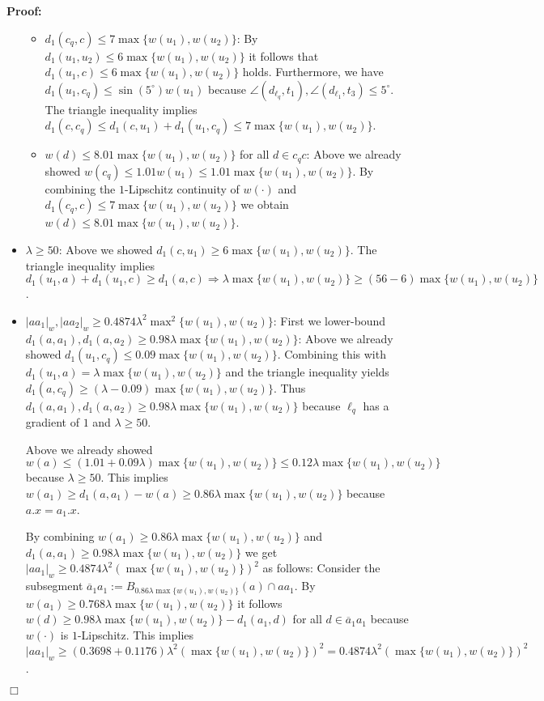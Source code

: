 \documentclass[a4paper,11pt]{article}
\newenvironment{proof}{\textbf{Proof:}}{\hspace*{0mm}\hfill\ensuremath{\Box}}
\begin{document}
\begin{proof}
\begin{itemize}
\begin{itemize}
				\item $d_1(c_q,c) \leq 7 \max \{ w(u_1), w(u_2) \}$: By $d_1(u_1,u_2) \leq 6 \max \{ w(u_1), w(u_2) \}$ it follows that $d_1(u_1,c) \leq 6 \max \{ w(u_1), w(u_2) \}$ holds. Furthermore, we have $d_1(u_1,c_q) \leq \sin (5^{\circ}) w(u_1)$ because $\angle (d_{\ell_q},t_1),\angle (d_{\ell_1}, t_3) \leq 5^{\circ}$. The triangle inequality implies $d_1(c,c_q) \leq d_1(c,u_1) + d_1(u_1,c_q) \leq 7 \max \{ w(u_1), w(u_2) \}$.
				\item $w(d) \leq 8.01 \max \{ w(u_1), w(u_2) \}$ for all $d \in c_qc$: Above we already showed $w(c_q) \leq 1.01 w(u_1) \leq 1.01 \max \{ w(u_1),w(u_2) \}$. By combining the $1$-Lipschitz continuity of $w(\cdot)$ and $d_1(c_q,c) \leq 7 \max \{ w(u_1), w(u_2) \}$ we obtain $w(d) \leq 8.01 \max \{ w(u_1), w(u_2) \}$.
			\end{itemize}
		\item $\lambda \geq 50$: Above we showed $d_1(c,u_1) \geq 6 \max \{ w(u_1), w(u_2) \}$. The triangle inequality implies $d_1(u_1,a) + d_1(u_1,c) \geq d_1(a,c) \Rightarrow \lambda \max \{ w(u_1), w(u_2) \} \geq (56 - 6) \max \{ w(u_1),w(u_2) \}$.
		\item $|aa_1|_w, |aa_2|_w \geq 0.4874 \lambda^2 \max^2 \{ w(u_1),w(u_2) \}$: First we lower-bound $d_1(a,a_1), d_1(a,a_2) \geq 0.98 \lambda \max \{ w(u_1),w(u_2) \}$: Above we already showed $d_1(u_1,c_q) \leq 0.09 \max \{ w(u_1),w(u_2) \}$. Combining this with $d_1(u_1,a) = \lambda \max \{ w(u_1),w(u_2) \}$ and the triangle inequality yields $d_1(a,c_q) \geq (\lambda-0.09) \max \{ w(u_1), w(u_2) \}$. Thus $d_1(a,a_1), d_1(a,a_2) \geq 0.98 \lambda \max \{ w(u_1),w(u_2) \}$ because $\ell_q$ has a gradient of $1$ and $\lambda \geq 50$. 
		
	Above we already showed $w(a) \leq (1.01 + 0.09 \lambda) \max \{ w(u_1), w(u_2) \} \leq 0.12 \lambda \max \{ w(u_1),w(u_2) \}$ because $\lambda \geq 50$. This implies $w(a_1) \geq d_1(a,a_1) - w(a) \geq 0.86 \lambda \max \{ w(u_1),w(u_2) \}$ because $a.x = a_1.x$.
		
	By combining $w(a_1) \geq 0.86 \lambda \max \{ w(u_1),w(u_2) \}$ and $d_1(a,a_1) \geq 0.98 \lambda \max \{ w(u_1),w(u_2) \}$ we get $|aa_1|_w \geq 0.4874 \lambda^2 (\max \{ w(u_1),w(u_2)\})^2$ as follows: Consider the subsegment $\overline{a}_1a_1 := B_{0.86 \lambda \max \{ w(u_1),w(u_2) \}}(a) \cap aa_1$. By $w(a_1) \geq 0.768 \lambda \max \{ w(u_1),w(u_2) \}$ it follows $w(d) \geq 0.98\lambda \max \{ w(u_1),w(u_2) \} - d_1(a_1,d)$ for all $d \in \overline{a}_1a_1$ because $w(\cdot)$ is $1$-Lipschitz. This implies $|aa_1|_w \geq (0.3698 + 0.1176)\lambda^2 (\max \{ w(u_1),w(u_2)\})^2 = 0.4874\lambda^2 (\max \{ w(u_1),w(u_2)\})^2$. 
	\end{itemize}
\end{proof}
\end{document}
